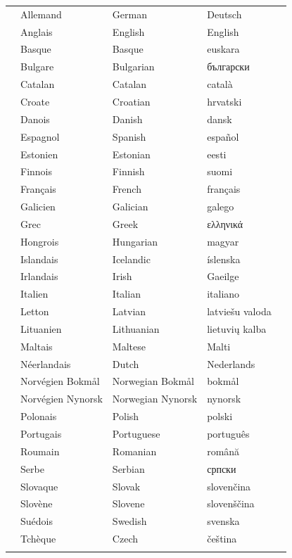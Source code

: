 \label{whitepaperseries}

\vspace*{-5mm}
\centering
  \setlength{\tabcolsep}{2em}
  \begin{tabularx}{\textwidth}{lllll} \toprule\addlinespace
  &Allemand & German & Deutsch& \\
  &Anglais & English & English& \\
  &Basque & Basque & euskara& \\
  &Bulgare & Bulgarian & български& \\
  &Catalan & Catalan & català& \\
  &Croate & Croatian & hrvatski& \\
  &Danois & Danish & dansk& \\
  &Espagnol & Spanish & español& \\
  &Estonien & Estonian & eesti& \\
  &Finnois & Finnish & suomi& \\
  &Français & French & français& \\
  &Galicien & Galician & galego& \\
  &Grec & Greek & ελληνικά& \\
  &Hongrois & Hungarian & magyar& \\ %
  &Islandais & Icelandic & íslenska& \\
  &Irlandais & Irish & Gaeilge& \\
  &Italien & Italian & italiano& \\
  &Letton & Latvian & latviešu valoda& \\
  &Lituanien & Lithuanian & lietuvių kalba& \\
  &Maltais & Maltese & Malti& \\
  &Néerlandais & Dutch & Nederlands& \\
  &Norvégien Bokmål & Norwegian Bokmål & bokmål& \\
  &Norvégien Nynorsk & Norwegian Nynorsk & nynorsk& \\
  &Polonais & Polish & polski& \\
  &Portugais & Portuguese & português& \\
  &Roumain & Romanian & română& \\
  &Serbe & Serbian & српски& \\
  &Slovaque & Slovak & slovenčina& \\
  &Slovène & Slovene & slovenščina& \\
  &Suédois & Swedish & svenska& \\
  &Tchèque & Czech & čeština& \\  \addlinespace \bottomrule
\end{tabularx}
